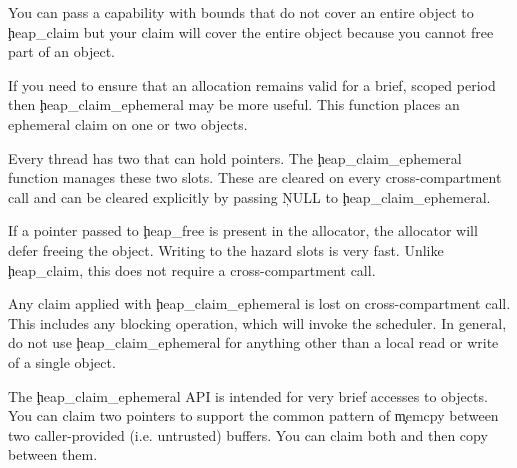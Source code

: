 \begin{note}
You can pass a capability with bounds that do not cover an entire object to \c{heap_claim} but your claim will cover the entire object because you cannot free part of an object.
\end{note}


If you need to ensure that an allocation remains valid for a brief, scoped period then \c{heap_claim_ephemeral} may be more useful.
This function places an ephemeral claim on one or two objects.


Every thread has two  that can hold pointers.
The \c{heap_claim_ephemeral} function manages these two slots.
These are cleared on every cross-compartment call and can be cleared explicitly by passing \c{NULL} to \c{heap_claim_ephemeral}.

If a pointer passed to \c{heap_free} is present in the allocator, the allocator will defer freeing the object.
Writing to the hazard slots is very fast.
Unlike \c{heap_claim}, this does not require a cross-compartment call.

\begin{caution}
	Any claim applied with \c{heap_claim_ephemeral} is lost on  cross-compartment call.
	This includes any blocking operation, which will invoke the scheduler.
	In general, do not use \c{heap_claim_ephemeral} for anything other than a local read or write of a single object.
\end{caution}

The \c{heap_claim_ephemeral} API is intended for very brief accesses to objects.
You can claim two pointers to support the common pattern of \c{memcpy} between two caller-provided (i.e. untrusted) buffers.
You can claim both and then copy between them.
